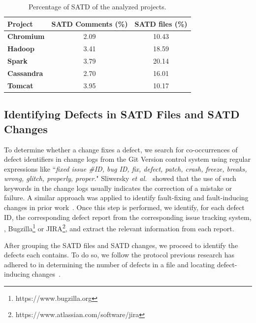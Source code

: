\begin{table}[tbh]
	\setlength{\tabcolsep}{.7\tabcolsep}
	\centering
	\caption{Percentage of SATD of the analyzed projects.}
	\begin{tabular}{l|c|c}
		\hline
		\textbf{Project}   & \textbf{SATD Comments (\%)} & \textbf{SATD files (\%)} \\ \hline
		\textbf{Chromium}  & 2.09             & 10.43                             \\ \hline
		\textbf{Hadoop}    & 3.41             & 18.59                             \\ \hline
		\textbf{Spark}     & 3.79             & 20.14                             \\ \hline
		\textbf{Cassandra} & 2.70             & 16.01                             \\ \hline
		\textbf{Tomcat}    & 3.95             & 10.17                             \\ \hline
	\end{tabular}
	\label{table:satd_analyzed_projects}
	\vspace{-0.2cm}
\end{table}


\subsection{Identifying Defects in SATD Files and SATD Changes}
\label{bugs}
To determine whether a change fixes a defect, we search for co-occurrences of defect identifiers in change logs from the Git Version control system using regular expressions like ``\textit{fixed issue \#ID, bug ID, fix, defect, patch, crash,  freeze, breaks, wrong, glitch, properly, proper}."
Sliwersky \textit{et al.}~\cite{sliwerski-msr-2005} showed that the use of such keywords in the change logs usually indicates the correction of a mistake or failure.
A similar  approach  was applied  to  identify  fault-fixing  and
fault-inducing  changes in  prior work~\cite{Kamei-tse-2013,Kim-tse-2008, sliwerski-msr-2005}. Once this step is performed, we identify, for each defect ID, the corresponding defect report from
the corresponding issue tracking system, \ie{}, Bugzilla\footnote{https://www.bugzilla.org} or JIRA\footnote{https://www.atlassian.com/software/jira}, and extract the relevant information from each report.

After grouping the SATD files and SATD changes, we proceed to identify the defects each contains. To do so, we follow the protocol previous research has adhered to in determining the number of defects in a file and locating defect-inducing changes~\cite{Kamei-tse-2013,Kim-tse-2008, sliwerski-msr-2005}.

